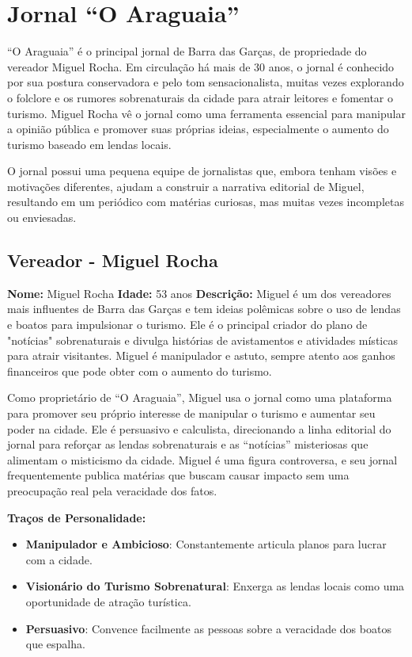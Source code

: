 \section{Jornal ``O Araguaia''}

 
``O Araguaia'' é o principal jornal de Barra das Garças, de propriedade do vereador Miguel Rocha. Em circulação há mais de 30 anos, o jornal é conhecido por sua postura conservadora e pelo tom sensacionalista, muitas vezes explorando o folclore e os rumores sobrenaturais da cidade para atrair leitores e fomentar o turismo. Miguel Rocha vê o jornal como uma ferramenta essencial para manipular a opinião pública e promover suas próprias ideias, especialmente o aumento do turismo baseado em lendas locais. 

O jornal possui uma pequena equipe de jornalistas que, embora tenham visões e motivações diferentes, ajudam a construir a narrativa editorial de Miguel, resultando em um periódico com matérias curiosas, mas muitas vezes incompletas ou enviesadas.


\subsection{Vereador - Miguel Rocha}

\textbf{Nome:} Miguel Rocha  
\textbf{Idade:} 53 anos  
\textbf{Descrição:}  
Miguel é um dos vereadores mais influentes de Barra das Garças e tem ideias polêmicas sobre o uso de lendas e boatos para impulsionar o turismo. Ele é o principal criador do plano de "notícias" sobrenaturais e divulga histórias de avistamentos e atividades místicas para atrair visitantes. Miguel é manipulador e astuto, sempre atento aos ganhos financeiros que pode obter com o aumento do turismo.

Como proprietário de ``O Araguaia'', Miguel usa o jornal como uma plataforma para promover seu próprio interesse de manipular o turismo e aumentar seu poder na cidade. Ele é persuasivo e calculista, direcionando a linha editorial do jornal para reforçar as lendas sobrenaturais e as “notícias” misteriosas que alimentam o misticismo da cidade. Miguel é uma figura controversa, e seu jornal frequentemente publica matérias que buscam causar impacto sem uma preocupação real pela veracidade dos fatos.

\textbf{Traços de Personalidade:}
\begin{itemize}
    \item \textbf{Manipulador e Ambicioso}: Constantemente articula planos para lucrar com a cidade.
    \item \textbf{Visionário do Turismo Sobrenatural}: Enxerga as lendas locais como uma oportunidade de atração turística.
    \item \textbf{Persuasivo}: Convence facilmente as pessoas sobre a veracidade dos boatos que espalha.
\end{itemize}



